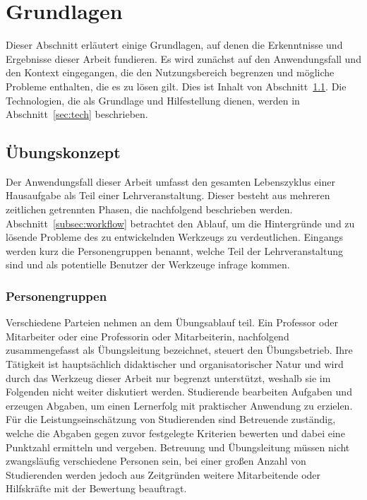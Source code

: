 \chapter{Grundlagen}\label{ch:basics}

Dieser Abschnitt erläutert einige Grundlagen, auf denen die Erkenntnisse und Ergebnisse dieser Arbeit fundieren.
Es wird zunächst auf den Anwendungsfall und den Kontext eingegangen, die den Nutzungsbereich begrenzen und mögliche Probleme enthalten, die es zu lösen gilt.
Dies ist Inhalt von Abschnitt~\ref{sec:programming-assignments}.
Die Technologien, die als Grundlage und Hilfestellung dienen, werden in Abschnitt~\ref{sec:tech} beschrieben.

\section{Übungskonzept}\label{sec:programming-assignments}

Der Anwendungsfall dieser Arbeit umfasst den gesamten Lebenszyklus einer Hausaufgabe als Teil einer Lehrveranstaltung.
Dieser besteht aus mehreren zeitlichen getrennten Phasen, die nachfolgend beschrieben werden.
Abschnitt~\ref{subsec:workflow} betrachtet den Ablauf, um die Hintergründe und zu lösende Probleme des zu entwickelnden Werkzeugs zu verdeutlichen.
Eingangs werden kurz die Personengruppen benannt, welche Teil der Lehrveranstaltung sind und als potentielle Benutzer der Werkzeuge infrage kommen.

\subsection{Personengruppen}\label{subsec:people}

Verschiedene Parteien nehmen an dem Übungsablauf teil.
Ein Professor oder Mitarbeiter oder eine Professorin oder Mitarbeiterin, nachfolgend zusammengefasst als Übungsleitung bezeichnet, steuert den Übungsbetrieb.
Ihre Tätigkeit ist hauptsächlich didaktischer und organisatorischer Natur und wird durch das Werkzeug dieser Arbeit nur begrenzt unterstützt, weshalb sie im Folgenden nicht weiter diskutiert werden.
Studierende bearbeiten Aufgaben und erzeugen Abgaben, um einen Lernerfolg mit praktischer Anwendung zu erzielen.
Für die Leistungseinschätzung von Studierenden sind Betreuende zuständig, welche die Abgaben gegen zuvor festgelegte Kriterien bewerten und dabei eine Punktzahl ermitteln und vergeben.
Betreuung und Übungsleitung müssen nicht zwangsläufig verschiedene Personen sein, bei einer großen Anzahl von Studierenden werden jedoch aus Zeitgründen weitere Mitarbeitende oder Hilfskräfte mit der Bewertung beauftragt.

